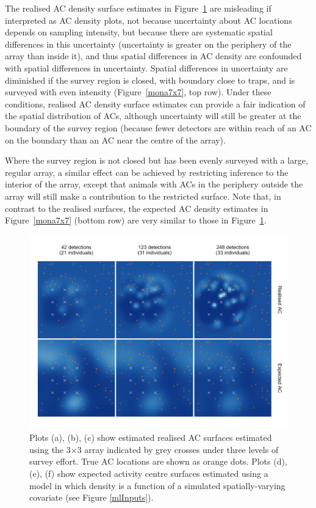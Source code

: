 \documentclass[useAMS,usenatbib,referee]{biom}
\begin{document}
The realised AC density surface estimates in Figure~\ref{mona3x3} are misleading if interpreted as AC density plots, not because uncertainty about AC locations depends on sampling intensity, but because there are systematic spatial differences in this uncertainty (uncertainty is greater on the periphery of the array than inside it), and thus spatial differences in AC density are confounded with spatial differences in uncertainty. Spatial differences in uncertainty are diminished if the survey region is closed, with boundary close to traps, and is surveyed with even intensity (Figure~\ref{mona7x7}, top row). Under these conditions, realised AC density surface estimates can provide a fair indication of the spatial distribution of ACs, although uncertainty will still be greater at the boundary of the survey region (because fewer detectors are within reach of an AC on the boundary than an AC near the centre of the array). 

Where the survey region is not closed but has been evenly surveyed with a large, regular array, a similar effect can be achieved by restricting inference to the interior of the array, except that animals with ACs in the periphery outside the array will still make a contribution to the restricted surface. Note that, in contrast to the realised surfaces, the expected AC density estimates in Figure~\ref{mona7x7} (bottom row) are very similar to those in Figure~\ref{mona3x3}. 

\begin{figure}[htbp]
\centering
\includegraphics[width=1\textwidth]{mona_3x3.png}
\caption{Plots (a), (b), (c) show estimated realised AC surfaces estimated using the 3$\times$3 array indicated by grey crosses under three levels of survey effort. True AC locations are shown as orange dots. Plots (d), (e), (f) show expected activity centre surfaces estimated using a model in which density is a function of a simulated spatially-varying covariate (see Figure \ref{mlInputs}).}
\label{mona3x3}
\end{figure}
\end{document}
